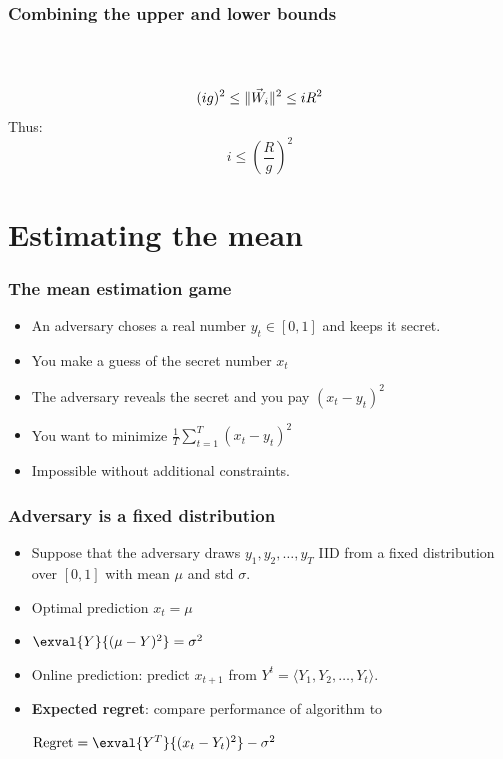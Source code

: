 \documentclass[handout]{beamer}
\begin{document}
\begin{frame}
\frametitle{Combining the upper and lower bounds}
~\\
~\\
\pause
$$(ig)^2 \leq \|\vec{W}_i\|^2 \leq i R^2$$
\pause
Thus:
$$ i \leq \left(\frac{R}{g} \right)^2 $$
\end{frame}

\section{Estimating the mean}

\begin{frame}
\frametitle{The mean estimation game}
\begin{itemize}
\item 
An adversary choses a real number $y_t \in [0,1]$ and keeps it secret.
\item
You make a guess of the secret number $x_t$
\item
The adversary reveals the secret and you pay $(x_t-y_t)^2$ 
\end{itemize}
\begin{itemize}
\item You want to minimize $\frac{1}{T}\sum_{t=1}^T \left(x_t-y_t \right)^2$
\item Impossible without additional constraints.
\end{itemize}
\end{frame}

\begin{frame}
\frametitle{Adversary is a fixed distribution}
\begin{itemize}
\item 
Suppose that the adversary draws $y_1,y_2,\ldots,y_T$ IID from a fixed
distribution over $[0,1]$ with mean $\mu$ and std $\sigma$.
\item
Optimal prediction $x_t = \mu$ 
\item 
  $\exval{Y}{(\mu-Y)^2} = \sigma^2$
\item Online prediction: predict $x_{t+1}$ from $Y^t = \langle
  Y_1,Y_2,\ldots,Y_t \rangle$.
\item {\bf Expected regret}: compare performance of algorithm to
  
  $ \regret = \exval{Y^T}{(x_t-Y_t)^2} - \sigma^2$
\end{itemize}
\end{frame}
\end{document}
